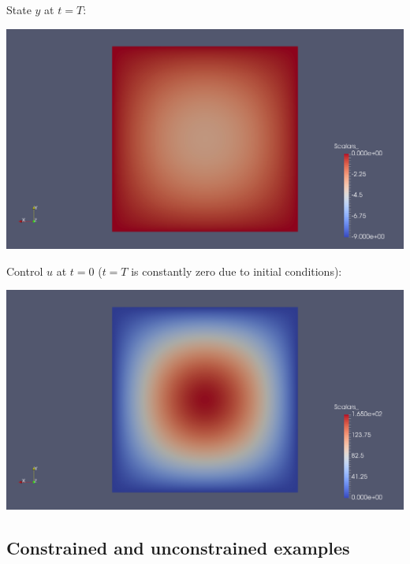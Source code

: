 \documentclass[10pt, USenglish]{beamer}
\begin{document}
\begin{frame}
State $y$ at $t = T$:
\begin{center}
\includegraphics[width=\textwidth]{../thesis/Images/symm-3r-y-Tt.png}
\end{center}
\end{frame}

\begin{frame}
Control $u$ at $t = 0$ ($t = T$ is constantly zero due to initial conditions):
\begin{center}
\includegraphics[width=\textwidth]{../thesis/Images/symm-3r-u-0t.png}
\end{center}
\end{frame}

\subsection{Constrained and unconstrained examples}
\end{document}
